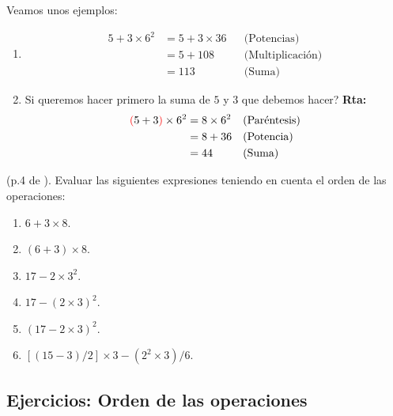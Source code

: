 Veamos unos ejemplos:
\begin{ejemplo}
		\begin{enumerate}
		\item 	
			\begin{align*}
					5+3\times 6^2	&= 5+3\times 36 & &\text{(Potencias)}\\
												&= 5+108 & &\text{(Multiplicación)}\\
												&= 113 & &\text{(Suma)}
			\end{align*}
		\item 	Si queremos hacer primero la suma de $5$ y $3$ que debemos hacer? \textbf{Rta:}
			\begin{align*}
			\color{red}(\color{black}5+3\color{red})\color{black}\times 6^2	&= 8\times 6^2 & &\text{(Paréntesis)}\\
			&= 8+36 & &\text{(Potencia)}\\
			&= 44 & &\text{(Suma)}
			\end{align*}
		\end{enumerate}
\end{ejemplo}

\begin{ejemplo}
	(p.4 de \cite{Aops_algebra}). Evaluar las siguientes expresiones teniendo en cuenta el orden de las operaciones:
	\begin{multicols}{2}
		\begin{enumerate}[label=\Alph*)]
			\item $6+3\times 8$.
			\item $(6+3)\times 8$.
			\item $17-2\times 3^2$.	
			\item $17 - {(2\times 3)}^2$.
			\item ${(17-2\times 3)}^2$.
			\item $\left[ (15-3)/2 \right]\times 3 - (2^2\times 3)/6$.					
		\end{enumerate}	
	\end{multicols}
\end{ejemplo}

\newpage

\begin{center}
	\vspace{-1cm}
	\subsection{ Ejercicios: Orden de las operaciones}\label{ejercicios_subsubsection_orden_de_las_operaciones}
\end{center}

